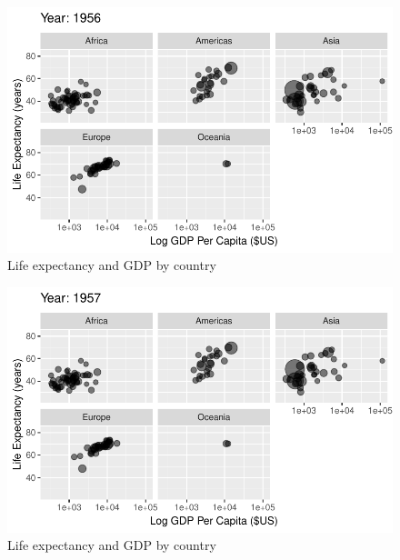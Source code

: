\documentclass[
  letterpaper,
  DIV=11,
  numbers=noendperiod]{scrreport}
\theoremstyle{definition}
\theoremstyle{remark}
\begin{document}
\begin{figure}

{\centering \includegraphics{index_files/figure-pdf/fig-anim-lifegdp-9.pdf}

}

\caption{\label{fig-anim-lifegdp-9}Life expectancy and GDP by country}

\end{figure}

\begin{figure}

{\centering \includegraphics{index_files/figure-pdf/fig-anim-lifegdp-10.pdf}

}

\caption{\label{fig-anim-lifegdp-10}Life expectancy and GDP by country}

\end{figure}
\end{document}
